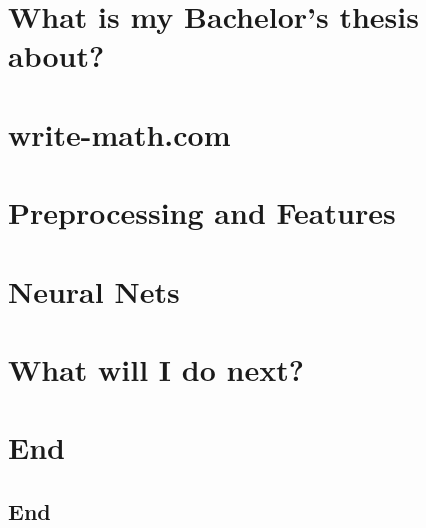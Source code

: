 \documentclass[hyperref={pdfpagelabels=false},usepdftitle=false]{beamer}
\begin{document}

\title{\titleText}
\subtitle{Bachelor's thesis of Martin Thoma}
\author{\tutor}
\date{5th of June, 2014}

\frame{\titlepage}



\section{What is my Bachelor's thesis about?}


\section{write-math.com}


\section{Preprocessing and Features}



\section{Neural Nets}


\section{What will I do next?}


\section*{End}
\subsection{End}

\end{document}
